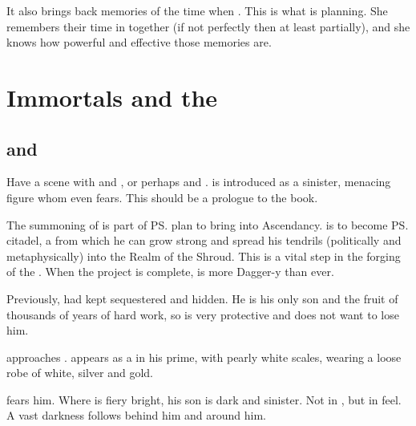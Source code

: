 It also brings back memories of the time when . 
This is what \Belzir{} is planning. 
She remembers their time in \Mystraacht{} together (if not perfectly then at least partially), and she knows how powerful and effective those memories are. 















\section{Immortals and the \Feud}









\subsection[Vizsherioch and Psyrex]{\Vizsherioch and \Psyrex}
Have a scene with \Vizsherioch and \Psyrex, or perhaps \Vizsherioch and \Secherdamon. 
\Vizsherioch is introduced as a sinister, menacing figure whom even \Psyrex fears. 
This should be a prologue to the book. 


The summoning of \Nithdornazsh{} is part of \ps{\Secherdamon} plan to bring  into Ascendancy. 
\Nithdornazsh{} is to become \ps{\Vizsherioch} citadel, a \nexus{} from which he can grow strong and spread his tendrils (politically and metaphysically) into the Realm of the Shroud. 
This is a vital step in the forging of the . 
When the \Nithdornazsh{} project is complete, \Vizsherioch{} is more Dagger-y than ever. 

Previously, \Secherdamon{} had kept \Vizsherioch{} sequestered and hidden. 
He is his only son and the fruit of thousands of years of hard work, so \Secherdamon{} is very protective and does not want to lose him. 

\Vizsherioch approaches \LocarPsyrex.
\Vizsherioch appears as a \dax in his prime, with pearly white scales, wearing a loose robe of white, silver and gold. 

\Psyrex fears him. 
Where \Secherdamon is fiery bright, his son \Vizsherioch is dark and sinister. 
Not in \colour, but in feel. 
A vast darkness follows behind him and around him. 


